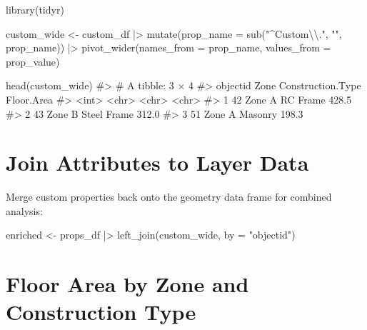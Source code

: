 \documentclass[
  11pt,
  letterpaper,
  DIV=11,
  numbers=noendperiod]{scrreprt}
\newenvironment{Shaded}{\begin{snugshade}}{\end{snugshade}}
\newcommand{\AttributeTok}[1]{\textcolor[rgb]{0.40,0.45,0.13}{#1}}
\newcommand{\CommentTok}[1]{\textcolor[rgb]{0.37,0.37,0.37}{#1}}
\newcommand{\FunctionTok}[1]{\textcolor[rgb]{0.28,0.35,0.67}{#1}}
\newcommand{\NormalTok}[1]{\textcolor[rgb]{0.00,0.23,0.31}{#1}}
\newcommand{\OtherTok}[1]{\textcolor[rgb]{0.00,0.23,0.31}{#1}}
\newcommand{\SpecialCharTok}[1]{\textcolor[rgb]{0.37,0.37,0.37}{#1}}
\newcommand{\StringTok}[1]{\textcolor[rgb]{0.13,0.47,0.30}{#1}}
\begin{document}
\begin{Shaded}
\begin{Highlighting}[]
\FunctionTok{library}\NormalTok{(tidyr)}

\NormalTok{custom\_wide }\OtherTok{\textless{}{-}}\NormalTok{ custom\_df }\SpecialCharTok{|\textgreater{}}
  \FunctionTok{mutate}\NormalTok{(}\AttributeTok{prop\_name =} \FunctionTok{sub}\NormalTok{(}\StringTok{"\^{}Custom}\SpecialCharTok{\textbackslash{}\textbackslash{}}\StringTok{."}\NormalTok{, }\StringTok{""}\NormalTok{, prop\_name)) }\SpecialCharTok{|\textgreater{}}
  \FunctionTok{pivot\_wider}\NormalTok{(}\AttributeTok{names\_from  =}\NormalTok{ prop\_name,}
              \AttributeTok{values\_from =}\NormalTok{ prop\_value)}

\FunctionTok{head}\NormalTok{(custom\_wide)}
\CommentTok{\#\textgreater{} \# A tibble: 3 × 4}
\CommentTok{\#\textgreater{}   objectid Zone   Construction.Type Floor.Area}
\CommentTok{\#\textgreater{}      \textless{}int\textgreater{} \textless{}chr\textgreater{}  \textless{}chr\textgreater{}             \textless{}chr\textgreater{}}
\CommentTok{\#\textgreater{} 1       42 Zone A RC Frame          428.5}
\CommentTok{\#\textgreater{} 2       43 Zone B Steel Frame       312.0}
\CommentTok{\#\textgreater{} 3       51 Zone A Masonry           198.3}
\end{Highlighting}
\end{Shaded}

\section{Join Attributes to Layer
Data}\label{join-attributes-to-layer-data}

Merge custom properties back onto the geometry data frame for combined
analysis:

\begin{Shaded}
\begin{Highlighting}[]
\NormalTok{enriched }\OtherTok{\textless{}{-}}\NormalTok{ props\_df }\SpecialCharTok{|\textgreater{}}
  \FunctionTok{left\_join}\NormalTok{(custom\_wide, }\AttributeTok{by =} \StringTok{"objectid"}\NormalTok{)}
\end{Highlighting}
\end{Shaded}

\section{Floor Area by Zone and Construction
Type}\label{floor-area-by-zone-and-construction-type}
\end{document}

